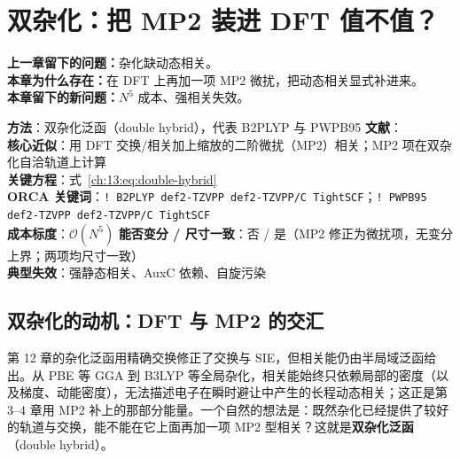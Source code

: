 
\section{双杂化：把 MP2 装进 DFT 值不值？}
\label{ch:13:sec:title}

\begin{problemchain}
\textbf{上一章留下的问题：}杂化缺动态相关。\\
\textbf{本章为什么存在：}在 DFT 上再加一项 MP2 微扰，把动态相关显式补进来。\\
\textbf{本章留下的新问题：}$N^5$ 成本、强相关失效。
\end{problemchain}

\begin{methodcard}
\textbf{方法}：双杂化泛函（double hybrid），代表 B2PLYP 与 PWPB95\quad
\textbf{文献}：\citep{grimme2006b2plyp,goerigk2011pwpb95}\\
\textbf{核心近似}：用 DFT 交换/相关加上缩放的二阶微扰（MP2）相关；MP2 项在双杂化自洽轨道上计算\\
\textbf{关键方程}：式~\eqref{ch:13:eq:double-hybrid}\\
\textbf{ORCA 关键词}：\texttt{! B2PLYP def2-TZVPP def2-TZVPP/C TightSCF}；\texttt{! PWPB95 def2-TZVPP def2-TZVPP/C TightSCF}\\
\textbf{成本标度}：$\mathcal{O}(N^5)$\quad
\textbf{能否变分 / 尺寸一致}：否 / 是（MP2 修正为微扰项，无变分上界；两项均尺寸一致）\\
\textbf{典型失效}：强静态相关、AuxC 依赖、自旋污染
\end{methodcard}

\subsection{双杂化的动机：DFT 与 MP2 的交汇}
\label{ch:13:sec:motivation}

第 12 章的杂化泛函用精确交换修正了交换与 SIE，但相关能仍由半局域泛函给出。从 PBE 等 GGA\citep{perdew1996pbe} 到 B3LYP 等全局杂化\citep{becke1993b3lyp}，相关能始终只依赖局部的密度（以及梯度、动能密度），无法描述电子在瞬时避让中产生的长程动态相关；这正是第 3--4 章用 MP2 补上的那部分能量。一个自然的想法是：既然杂化已经提供了较好的轨道与交换，能不能在它上面再加一项 MP2 型相关？这就是\textbf{双杂化泛函}（double hybrid）\citep{grimme2006b2plyp}。

